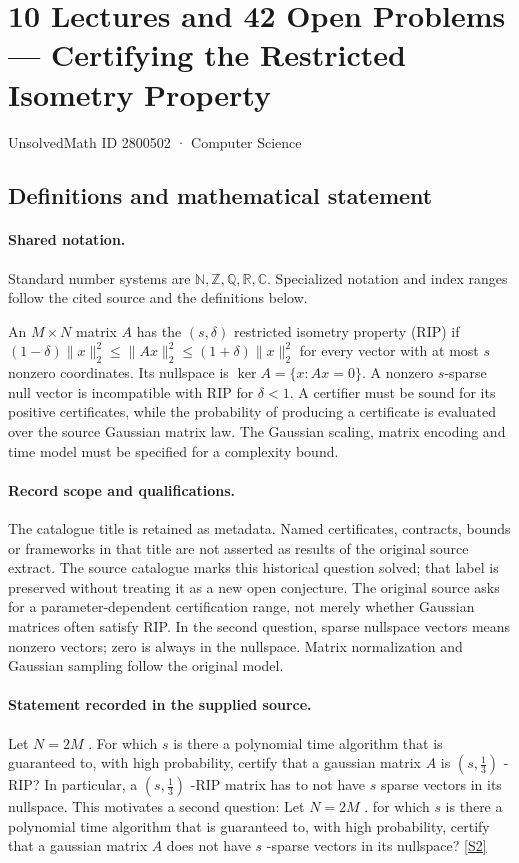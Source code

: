 \documentclass[11pt]{article}
\newcommand{\sref}[2]{\hyperlink{source:#1:#2}{[S#2]}}
\begin{document}
\setcounter{section}{2800501}
\section{10 Lectures and 42 Open Problems — Certifying the Restricted Isometry Property}\label{2800502}
{\small\sffamily UnsolvedMath ID 2800502 · Computer Science}
\subsection{Definitions and mathematical statement}

\paragraph{Shared notation.}Standard number systems are $\mathbb N,\mathbb Z,\mathbb Q,\mathbb R,\mathbb C$. Specialized notation and index ranges follow the cited source and the definitions below.


An $M\times N$ matrix $A$ has the $(s,\delta)$ restricted isometry property (RIP) if $(1-\delta)\lVert x\rVert_2^2\leq\lVert Ax\rVert_2^2\leq(1+\delta)\lVert x\rVert_2^2$ for every vector with at most $s$ nonzero coordinates. Its nullspace is $\ker A=\{x:Ax=0\}$. A nonzero $s$-sparse null vector is incompatible with RIP for $\delta<1$. A certifier must be sound for its positive certificates, while the probability of producing a certificate is evaluated over the source Gaussian matrix law. The Gaussian scaling, matrix encoding and time model must be specified for a complexity bound.
\paragraph{Record scope and qualifications.}
The catalogue title is retained as metadata. Named certificates, contracts, bounds or frameworks in that title are not asserted as results of the original source extract.
The source catalogue marks this historical question solved; that label is preserved without treating it as a new open conjecture. The original source asks for a parameter-dependent certification range, not merely whether Gaussian matrices often satisfy RIP. In the second question, sparse nullspace vectors means nonzero vectors; zero is always in the nullspace. Matrix normalization and Gaussian sampling follow the original model.
\paragraph{Statement recorded in the supplied source.}
Let $N = 2M$ . For which $s$ is there a polynomial time algorithm that is guaranteed to, with high probability, certify that a gaussian matrix $A$ is $\left(s,\frac13\right)$ -RIP? In particular, a $\left(s,\frac13\right)$ -RIP matrix has to not have $s$ sparse vectors in its nullspace. This motivates a second question: Let $N = 2M$ . for which $s$ is there a polynomial time algorithm that is guaranteed to, with high probability, certify that a gaussian matrix $A$ does not have $s$ -sparse vectors in its nullspace? \sref{2800502}{2}
\end{document}
